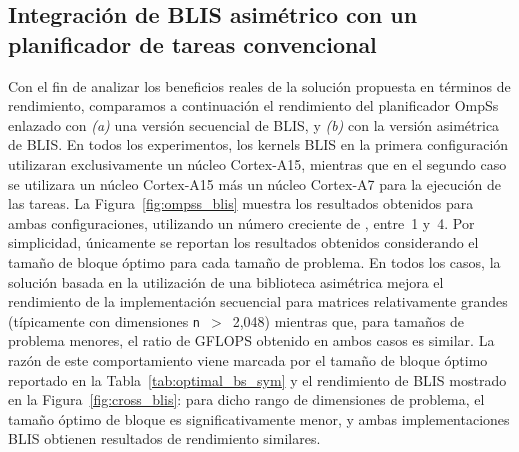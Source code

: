 \subsection{Integración de BLIS asimétrico con un planificador de tareas convencional}

Con el fin de analizar los beneficios reales de la solución propuesta en términos de rendimiento, comparamos a continuación
el rendimiento del planificador OmpSs enlazado con {\em (a)} una versión secuencial de BLIS, y {\em (b)} con la versión asimétrica de BLIS. 
En todos los experimentos, los kernels BLIS en la primera configuración utilizaran exclusivamente un núcleo Cortex-A15, mientras
que en el segundo caso se utilizara un núcleo Cortex-A15 más un núcleo Cortex-A7 para la ejecución de las tareas.
%
La Figura~\ref{fig:ompss_blis} muestra los resultados obtenidos para ambas configuraciones, utilizando un número creciente
de \wts, entre~1 y~4. Por simplicidad, únicamente se reportan los resultados obtenidos considerando el tamaño de bloque óptimo
para cada tamaño de problema. En todos los casos, la solución basada en la utilización de una biblioteca asimétrica mejora
el rendimiento de la implementación secuencial para matrices relativamente grandes (típicamente con dimensiones {\tt n}~$>$~2,048)
mientras que, para tamaños de problema menores, el ratio de GFLOPS obtenido en ambos casos es similar. 
La razón de este comportamiento viene marcada por el tamaño de bloque óptimo reportado en la Tabla~\ref{tab:optimal_bs_sym}
y el rendimiento de BLIS mostrado en la Figura~\ref{fig:cross_blis}: para dicho rango de dimensiones de problema,
el tamaño óptimo de bloque es significativamente menor, y ambas implementaciones BLIS obtienen resultados de rendimiento similares.

